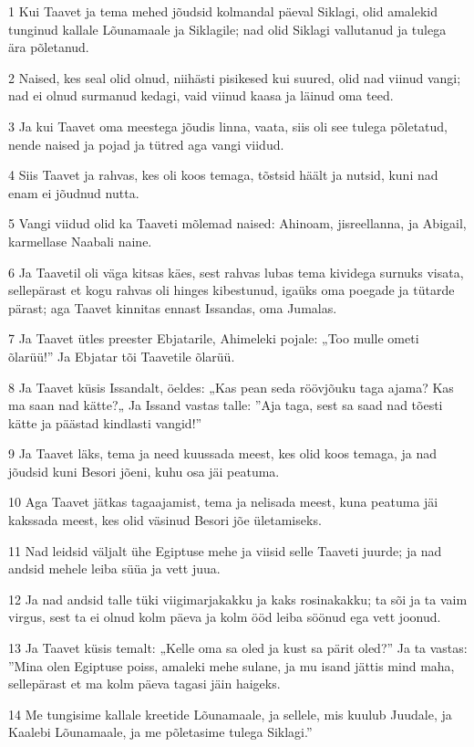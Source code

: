 \par 1 Kui Taavet ja tema mehed jõudsid kolmandal päeval Siklagi, olid amalekid tunginud kallale Lõunamaale ja Siklagile; nad olid Siklagi vallutanud ja tulega ära põletanud.
\par 2 Naised, kes seal olid olnud, niihästi pisikesed kui suured, olid nad viinud vangi; nad ei olnud surmanud kedagi, vaid viinud kaasa ja läinud oma teed.
\par 3 Ja kui Taavet oma meestega jõudis linna, vaata, siis oli see tulega põletatud, nende naised ja pojad ja tütred aga vangi viidud.
\par 4 Siis Taavet ja rahvas, kes oli koos temaga, tõstsid häält ja nutsid, kuni nad enam ei jõudnud nutta.
\par 5 Vangi viidud olid ka Taaveti mõlemad naised: Ahinoam, jisreellanna, ja Abigail, karmellase Naabali naine.
\par 6 Ja Taavetil oli väga kitsas käes, sest rahvas lubas tema kividega surnuks visata, sellepärast et kogu rahvas oli hinges kibestunud, igaüks oma poegade ja tütarde pärast; aga Taavet kinnitas ennast Issandas, oma Jumalas.
\par 7 Ja Taavet ütles preester Ebjatarile, Ahimeleki pojale: „Too mulle ometi õlarüü!” Ja Ebjatar tõi Taavetile õlarüü.
\par 8 Ja Taavet küsis Issandalt, öeldes: „Kas pean seda röövjõuku taga ajama? Kas ma saan nad kätte?„ Ja Issand vastas talle: ”Aja taga, sest sa saad nad tõesti kätte ja päästad kindlasti vangid!”
\par 9 Ja Taavet läks, tema ja need kuussada meest, kes olid koos temaga, ja nad jõudsid kuni Besori jõeni, kuhu osa jäi peatuma.
\par 10 Aga Taavet jätkas tagaajamist, tema ja nelisada meest, kuna peatuma jäi kakssada meest, kes olid väsinud Besori jõe ületamiseks.
\par 11 Nad leidsid väljalt ühe Egiptuse mehe ja viisid selle Taaveti juurde; ja nad andsid mehele leiba süüa ja vett juua.
\par 12 Ja nad andsid talle tüki viigimarjakakku ja kaks rosinakakku; ta sõi ja ta vaim virgus, sest ta ei olnud kolm päeva ja kolm ööd leiba söönud ega vett joonud.
\par 13 Ja Taavet küsis temalt: „Kelle oma sa oled ja kust sa pärit oled?” Ja ta vastas: ”Mina olen Egiptuse poiss, amaleki mehe sulane, ja mu isand jättis mind maha, sellepärast et ma kolm päeva tagasi jäin haigeks.
\par 14 Me tungisime kallale kreetide Lõunamaale, ja sellele, mis kuulub Juudale, ja Kaalebi Lõunamaale, ja me põletasime tulega Siklagi.”
